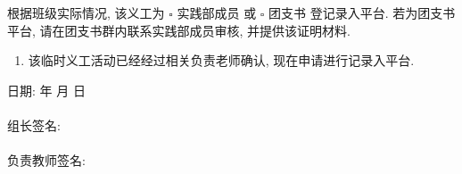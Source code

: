 \documentclass{article}
\begin{document}
根据班级实际情况, 该义工为 $\square$ 实践部成员 或 $\square$ 团支书 登记录入平台. 若为团支书平台, 请在团支书群内联系实践部成员审核, 并提供该证明材料.

\begin{enumerate}[label=$\square$]
  \item 该临时义工活动已经经过相关负责老师确认, 现在申请进行记录入平台.
\end{enumerate}

\begin{flushright}
  日期: \underline{\hspace{4em}} 年 \underline{\hspace{2em}} 月 \underline{\hspace{2em}} 日
  ~\\~\\
  组长签名: \underline{\hspace{6em}}
  ~\\~\\
  负责教师签名: \underline{\hspace{6em}}
\end{flushright}
\end{document}

